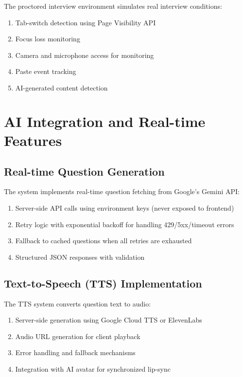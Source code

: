 \documentclass[12pt, conference]{IEEEtran}
\begin{document}
The proctored interview environment simulates real interview conditions:
\begin{enumerate}
    \item Tab-switch detection using Page Visibility API
    \item Focus loss monitoring
    \item Camera and microphone access for monitoring
    \item Paste event tracking
    \item AI-generated content detection
\end{enumerate}

\section{AI Integration and Real-time Features}

\subsection{Real-time Question Generation}

The system implements real-time question fetching from Google's Gemini API:
\begin{enumerate}
    \item Server-side API calls using environment keys (never exposed to frontend)
    \item Retry logic with exponential backoff for handling 429/5xx/timeout errors
    \item Fallback to cached questions when all retries are exhausted
    \item Structured JSON responses with validation
\end{enumerate}

\subsection{Text-to-Speech (TTS) Implementation}

The TTS system converts question text to audio:
\begin{enumerate}
    \item Server-side generation using Google Cloud TTS or ElevenLabs
    \item Audio URL generation for client playback
    \item Error handling and fallback mechanisms
    \item Integration with AI avatar for synchronized lip-sync
\end{enumerate}
\end{document}
